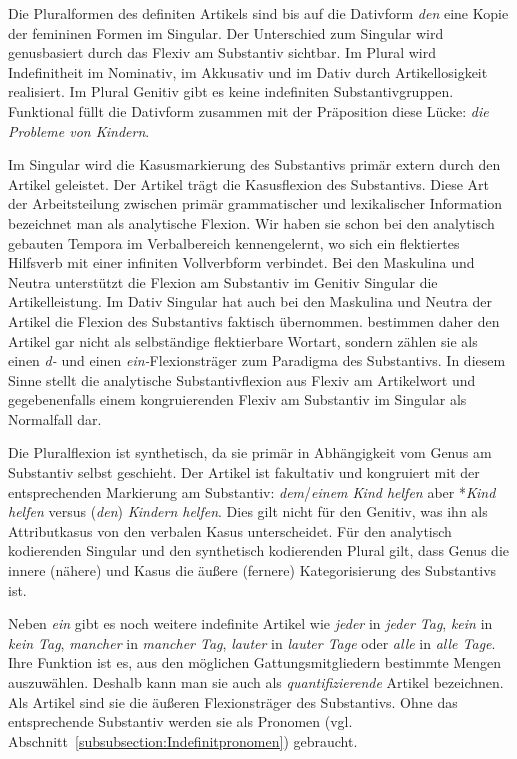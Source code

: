 Die Pluralformen des definiten Artikels sind bis auf die Dativform \textit{den} eine Kopie der femininen Formen im Singular. Der Unterschied zum Singular wird genusbasiert durch das Flexiv am Substantiv sichtbar. Im Plural wird Indefinitheit im Nominativ, im Akkusativ und im Dativ durch Artikellosigkeit realisiert. Im Plural Genitiv gibt es keine indefiniten Substantivgruppen. Funktional füllt die Dativform zusammen mit der Präposition diese Lücke: \textit{die Probleme von Kindern}.  

Im Singular wird die Kasusmarkierung des Substantivs primär extern durch den Artikel geleistet. Der Artikel trägt die Kasusflexion des Substantivs. Diese Art der Arbeitsteilung zwischen primär grammatischer und lexikalischer Information bezeichnet man als analytische Flexion. Wir haben sie schon bei den analytisch gebauten Tempora im Verbalbereich kennengelernt, wo sich ein flektiertes Hilfsverb mit einer infiniten Vollverbform verbindet. Bei den Maskulina und Neutra unterstützt die Flexion am Substantiv im Genitiv Singular die Artikelleistung. Im Dativ Singular hat auch bei den Maskulina und Neutra der Artikel die Flexion des Substantivs faktisch übernommen. \citet[570]{HeidolphFlaemigMotsch1981} bestimmen daher den Artikel gar nicht als selbständige flektierbare Wortart, sondern zählen sie als einen \textit{d-} und einen \textit{ein-}Flexionsträger zum Paradigma des Substantivs. In diesem Sinne stellt \citet{Agel1996} die analytische Substantivflexion aus Flexiv am Artikelwort und gegebenenfalls einem kongruierenden Flexiv am Substantiv im Singular als Normalfall dar. 

Die Pluralflexion ist synthetisch, da sie primär in Abhängigkeit vom Genus am Substantiv selbst geschieht. Der Artikel ist fakultativ und kongruiert mit der entsprechenden Markierung am Substantiv: \textit{dem}/\textit{einem Kind helfen} aber *\textit{Kind} \textit{helfen} versus (\textit{den}) \textit{Kindern helfen}. Dies gilt nicht für den Genitiv, was ihn als Attributkasus von den verbalen Kasus unterscheidet. Für den analytisch kodierenden Singular und den synthetisch kodierenden Plural gilt, dass Genus die innere (nähere) und Kasus die äußere (fernere) Kategorisierung des Substantivs ist. 

Neben \textit{ein} gibt es noch weitere indefinite Artikel wie \textit{jeder} in \textit{jeder Tag}, \textit{kein} in \textit{kein Tag}, \textit{mancher} in \textit{mancher Tag}, \textit{lauter} in \textit{lauter Tage} oder \textit{alle} in \textit{alle Tage}. Ihre Funktion ist es, aus den möglichen Gattungsmitgliedern bestimmte Mengen auszuwählen. Deshalb kann man sie auch als \textit{quantifizierende} Artikel bezeichnen. Als Artikel sind sie die äußeren Flexionsträger des Substantivs. Ohne das entsprechende Substantiv werden sie als Pronomen (vgl. Abschnitt~\ref{subsubsection:Indefinitpronomen}) gebraucht.

